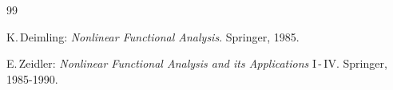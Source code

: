 \documentclass[11pt,twoside]{article}
\begin{document}
\begin{thebibliography}{99}
\begin{small}

  K.\,Deimling:
\textit{Nonlinear Functional Analysis}.
Springer, 1985.

  E.\,Zeidler:
\textit{Nonlinear Functional Analysis and its Applications} I\,-\,IV.
Springer, 1985-1990.

\end{small}
\end{thebibliography}

\end{document}
